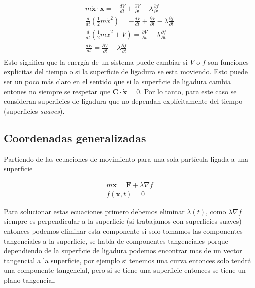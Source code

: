 \begin{enumerate}
            \begin{gather*}
                m\ddot{\mathbf{x}}\cdot \dot{\mathbf{x}} = -\frac{dV}{dt} + \frac{\partial V}{\partial t} - \lambda\frac{\partial f}{\partial t}\\
                \frac{d}{dt}\left(\frac{1}{2}m\dot{x}^2\right) = -\frac{dV}{dt} + \frac{\partial V}{\partial t} - \lambda\frac{\partial f}{\partial t}\\
                \frac{d}{dt}\left(\frac{1}{2}m\dot{x}^2 + V \right) =    \frac{\partial V}{\partial t} - \lambda\frac{\partial f}{\partial t}\\
                \frac{dE}{dt} =    \frac{\partial V}{\partial t} - \lambda\frac{\partial f}{\partial t}\\
            \end{gather*}
            Esto significa que la energía de un sistema puede cambiar si $V$ o $f$ son funciones explicitas del tiempo o si la superficie de ligadura se esta moviendo. Esto puede ser un poco más claro en el sentido que si la superficie de ligadura cambia entones no siempre se respetar que $\mathbf{C}\cdot \mathbf{\dot{x}} = 0$. Por lo tanto, para este caso se consideran superficies de ligadura que no dependan explícitamente del tiempo (superficies \textit{suaves}).
    \end{enumerate}

\subsection[short]{Coordenadas generalizadas}

    Partiendo de las ecuaciones de movimiento para una sola partícula ligada a una superficie

    \begin{gather*}
        m\ddot{\mathbf{x}} = \mathbf{F} + \lambda \nabla f\\
        f(\mathbf{x},t) = 0
    \end{gather*}

    Para solucionar estas ecuaciones primero debemos eliminar $\lambda(t)$, como  $\lambda \nabla f$ siempre es perpendicular a la superficie (si trabajamos con superficies suaves) entonces podemos eliminar esta componente si solo tomamos las componentes tangenciales a la superficie, se habla de componentes tangenciales porque dependiendo de la superficie de ligadura podemos encontrar mas de un vector tangencial a la superficie, por ejemplo si tenemos una curva entonces solo tendrá una componente tangencial, pero si se tiene una superficie entonces se tiene un plano tangencial.

